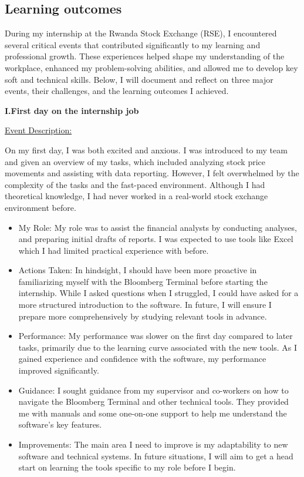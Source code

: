 \documentclass{article}
\begin{document}
\begin{titlepage}
\begin{titlepage}
\begin{flushleft}
\begin{flushleft}
\section{\textbf{\huge{Learning outcomes}}}
\vspace{0.2cm}

During my internship at the Rwanda Stock Exchange (RSE), I encountered several critical events that contributed significantly to my learning and professional growth. These experiences helped shape my understanding of the workplace, enhanced my problem-solving abilities, and allowed me to develop key soft and technical skills. Below, I will document and reflect on three major events, their challenges, and the learning outcomes I achieved.
\vspace{0.3cm}

\textbf{I.First day on the internship job}
\vspace{0.2cm}

\underline{Event Description:}

On my first day, I was both excited and anxious. I was introduced to my team and given an overview of my tasks, which included analyzing stock price movements and assisting with data reporting. However, I felt overwhelmed by the complexity of the tasks and the fast-paced environment. Although I had theoretical knowledge, I had never worked in a real-world stock exchange environment before.

\vspace{0.2cm}
\begin{itemize}
    \item 

My Role:
My role was to assist the financial analysts by  conducting analyses, and preparing initial drafts of reports. I was expected to use tools like Excel which I had limited practical experience with before.
\item
Actions Taken:
In hindsight, I should have been more proactive in familiarizing myself with the Bloomberg Terminal before starting the internship. While I asked questions when I struggled, I could have asked for a more structured introduction to the software. In future, I will ensure I prepare more comprehensively by studying relevant tools in advance.
\item
Performance:
My performance was slower on the first day compared to later tasks, primarily due to the learning curve associated with the new tools. As I gained experience and confidence with the software, my performance improved significantly.
\item 
Guidance:
I sought guidance from my supervisor and co-workers on how to navigate the Bloomberg Terminal and other technical tools. They provided me with manuals and some one-on-one support to help me understand the software's key features.
\item 
Improvements:
The main area I need to improve is my adaptability to new software and technical systems. In future situations, I will aim to get a head start on learning the tools specific to my role before I begin.


\end{itemize}
\end{flushleft}
\end{flushleft}
\end{titlepage}
\end{titlepage}
\end{document}
